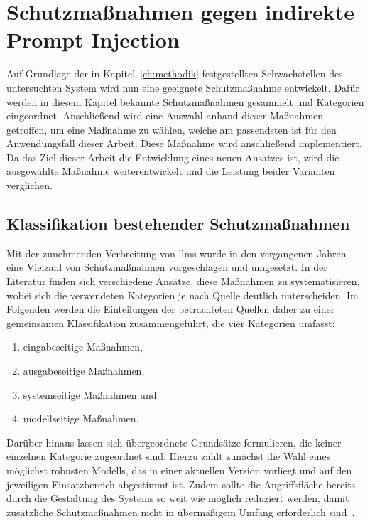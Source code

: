\chapter{Schutzmaßnahmen gegen indirekte Prompt Injection}\label{ch:schutzmassnahmen}

Auf Grundlage der in Kapitel~\ref{ch:methodik} festgestellten Schwachstellen des untersuchten System wird nun eine geeignete Schutzmaßnahme entwickelt. Dafür werden
in diesem Kapitel bekannte Schutzmaßnahmen gesammelt und Kategorien eingeordnet. Anschließend wird eine Auswahl anhand dieser Maßnahmen getroffen, um eine 
Maßnahme zu wählen, welche am passendsten ist für den Anwendungsfall dieser Arbeit. Diese Maßnahme wird anschließend implementiert. Da das Ziel dieser Arbeit die
Entwicklung eines neuen Ansatzes ist, wird die ausgewählte Maßnahme weiterentwickelt und die Leistung beider Varianten verglichen.

\section{Klassifikation bestehender Schutzmaßnahmen}\label{sec:klassifikation_schutzmassnahmen}

Mit der zunehmenden Verbreitung von \acp{llm} wurde in den vergangenen Jahren eine Vielzahl von Schutzmaßnahmen vorgeschlagen und umgesetzt. In der Literatur finden sich
verschiedene Ansätze, diese Maßnahmen zu systematisieren, wobei sich die verwendeten Kategorien je nach Quelle deutlich unterscheiden. Im Folgenden werden die
Einteilungen der betrachteten Quellen daher zu einer gemeinsamen Klassifikation zusammengeführt, die vier Kategorien umfasst:

\begin{enumerate}
    \item eingabeseitige Maßnahmen,
    \item ausgabeseitige Maßnahmen,
    \item systemseitige Maßnahmen und
    \item modellseitige Maßnahmen.
\end{enumerate}

Darüber hinaus lassen sich übergeordnete Grundsätze formulieren, die keiner einzelnen Kategorie zugeordnet sind. Hierzu zählt zunächst die Wahl eines möglichst robusten
Modells, das in einer aktuellen Version vorliegt und auf den jeweiligen Einsatzbereich abgestimmt ist. Zudem sollte die Angriffsfläche bereits durch die Gestaltung des
Systems so weit wie möglich reduziert werden, damit zusätzliche Schutzmaßnahmen nicht in übermäßigem Umfang erforderlich sind~\cite{sm04}.

